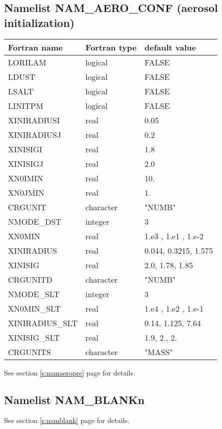 \subsection{Namelist NAM\_AERO\_CONF (aerosol initialization)}
\begin{longtable} {|p{}|p{}|p{}|}
\hline
Fortran name &  Fortran type & default value \\
\hline 
\endhead
\hline
\endfoot
LORILAM      & logical       & FALSE    \\
LDUST        & logical       & FALSE    \\
LSALT        & logical       & FALSE    \\
LINITPM      & logical       & FALSE    \\
XINIRADIUSI  & real          & 0.05     \\
XINIRADIUSJ  & real          & 0.2      \\
XINISIGI     & real          & 1.8      \\
XINISIGJ     & real          & 2.0      \\
XN0IMIN      & real          & 10.      \\
XN0JMIN      & real          & 1.       \\
CRGUNIT      & character     & "NUMB"   \\
NMODE\_DST   & integer       & 3       \\
XN0MIN       & real          & 1.e3 , 1.e1 , 1.e-2 \\
XINIRADIUS   & real          & 0.044, 0.3215, 1.575 \\
XINISIG      & real          & 2.0, 1.78, 1.85 \\
CRGUNITD     & character     & "NUMB"   \\
NMODE\_SLT   & integer       & 3       \\
XN0MIN\_SLT  & real          & 1.e4 , 1.e2 , 1.e-1 \\
XINIRADIUS\_SLT & real       & 0.14, 1.125,  7.64\\
XINISIG\_SLT    & real       & 1.9, 2., 2. \\
CRGUNITS     & character     & "MASS"   \\
\end{longtable}

See section \ref{s:namaeropre} page \pageref{s:namaeropre} for details.
			  
			  
\subsection{Namelist NAM\_BLANKn}
See section \ref{s:namblank} page \pageref{s:namblank} for details.

